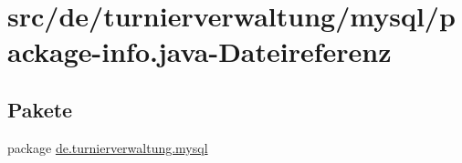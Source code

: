 \hypertarget{mysql_2package-info_8java}{}\section{src/de/turnierverwaltung/mysql/package-\/info.java-\/\+Dateireferenz}
\label{mysql_2package-info_8java}
\subsection*{Pakete}
\begin{DoxyCompactItemize}
\item 
package \hyperlink{namespacede_1_1turnierverwaltung_1_1mysql}{de.\+turnierverwaltung.\+mysql}
\end{DoxyCompactItemize}
